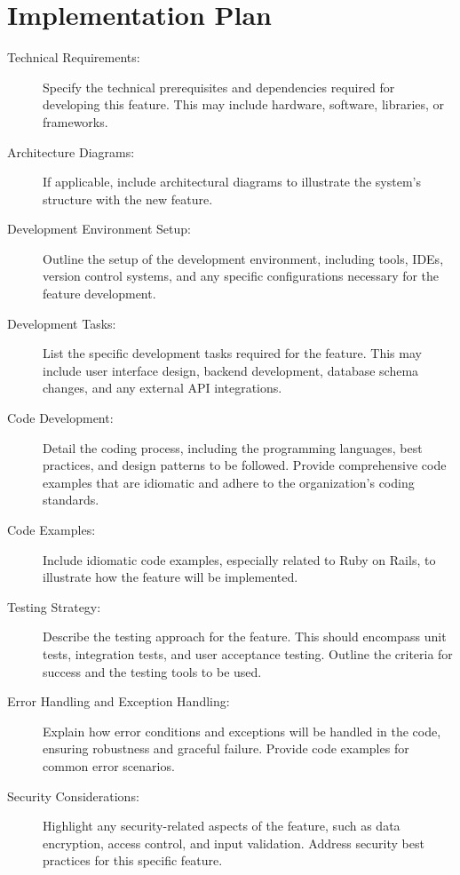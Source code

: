 \documentclass{article}
\begin{document}
\section{Implementation Plan}
\begin{description}
    \item[Technical Requirements:]
    Specify the technical prerequisites and dependencies required for developing this feature. This may include hardware, software, libraries, or frameworks.

    \item[Architecture Diagrams:] If applicable, include architectural diagrams to illustrate the system's structure with the new feature.

    \item[Development Environment Setup:]
    Outline the setup of the development environment, including tools, IDEs, version control systems, and any specific configurations necessary for the feature development.

    \item[Development Tasks:]
    List the specific development tasks required for the feature. This may include user interface design, backend development, database schema changes, and any external API integrations.

    \item[Code Development:]
    Detail the coding process, including the programming languages, best practices, and design patterns to be followed. Provide comprehensive code examples that are idiomatic and adhere to the organization's coding standards.
    
    \item[Code Examples:] Include idiomatic code examples, especially related to Ruby on Rails, to illustrate how the feature will be implemented.

    \item[Testing Strategy:]
    Describe the testing approach for the feature. This should encompass unit tests, integration tests, and user acceptance testing. Outline the criteria for success and the testing tools to be used.

    \item[Error Handling and Exception Handling:]
    Explain how error conditions and exceptions will be handled in the code, ensuring robustness and graceful failure. Provide code examples for common error scenarios.

    \item[Security Considerations:]
    Highlight any security-related aspects of the feature, such as data encryption, access control, and input validation. Address security best practices for this specific feature.


\end{description}
\end{document}
